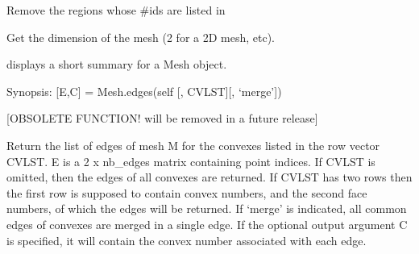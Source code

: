 \documentclass[a4paper,11pt,english]{sphinxmanual}
\begin{document}
\begin{fulllineitems}
\begin{fulllineitems}
\end{fulllineitems}


\begin{fulllineitems}
\label{\detokenize{python/cmdref_Mesh:getfem.Mesh.delete_region}}
Remove the regions whose \#ids are listed in 

\end{fulllineitems}


\begin{fulllineitems}
\label{\detokenize{python/cmdref_Mesh:getfem.Mesh.dim}}
Get the dimension of the mesh (2 for a 2D mesh, etc).

\end{fulllineitems}


\begin{fulllineitems}
\label{\detokenize{python/cmdref_Mesh:getfem.Mesh.display}}
displays a short summary for a Mesh object.

\end{fulllineitems}


\begin{fulllineitems}
\label{\detokenize{python/cmdref_Mesh:getfem.Mesh.edges}}
Synopsis: {[}E,C{]} = Mesh.edges(self {[}, CVLST{]}{[}, ‘merge’{]})

{[}OBSOLETE FUNCTION! will be removed in a future release{]}

Return the list of edges of mesh M for the convexes listed in the
row vector CVLST. E is a 2 x nb\_edges matrix containing point
indices. If CVLST is omitted, then the edges of all convexes are
returned. If CVLST has two rows then the first row is supposed to
contain convex numbers, and the second face numbers, of which the
edges will be returned.  If ‘merge’ is indicated, all common
edges of convexes are merged in a single edge.  If the optional
output argument C is specified, it will contain the convex number
associated with each edge.


\end{fulllineitems}
\end{fulllineitems}
\end{document}
